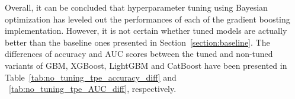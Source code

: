 \documentclass[magisterska, english]{pwr_wmat_praca_dyplomowa}
\theoremstyle{plain}
\numberwithin{theorem}{chapter}
\theoremstyle{definition}
\numberwithin{theorem}{chapter}
\begin{document}
Overall, it can be concluded that hyperparameter tuning using Bayesian optimization has leveled out the performances of each of the gradient boosting implementation. However, it is not certain whether tuned models are actually better than the baseline ones presented in Section~\ref{section:baseline}. The differences of accuracy and AUC scores between the tuned and non-tuned variants of GBM, XGBoost, LightGBM and CatBoost have been presented in Table~\ref{tab:no_tuning_tpe_accuracy_diff} and ~\ref{tab:no_tuning_tpe_AUC_diff}, respectively.

\end{document}
